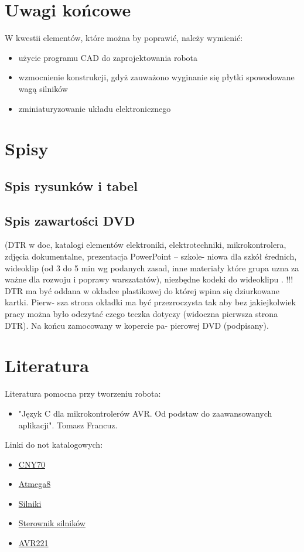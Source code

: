 \documentclass[11pt,a4paper]{article}
\begin{document}
\section{Uwagi końcowe}
W kwestii elementów, które można by poprawić, należy wymienić:
\begin{itemize}
  \item użycie programu CAD do zaprojektowania robota
  \item wzmocnienie konstrukcji, gdyż zauważono wyginanie się płytki spowodowane wagą silników
  \item zminiaturyzowanie układu elektronicznego
\end{itemize}

\section{Spisy}
\subsection{Spis rysunków i tabel} 
\listoffigures

\subsection{Spis zawartości DVD} 
(DTR w doc, katalogi elementów elektroniki,
elektrotechniki, mikrokontrolera, zdjęcia dokumentalne, prezentacja PowerPoint – szkole-
niowa dla szkół średnich, wideoklip (od 3 do 5 min wg podanych zasad, inne materiały które
grupa uzna za ważne dla rozwoju i poprawy warszatatów), niezbędne kodeki do wideoklipu .
!!! DTR ma być oddana w okładce plastikowej do której wpina się dziurkowane kartki. Pierw-
sza strona okładki ma być przezroczysta tak aby bez jakiejkolwiek pracy można było odczytać
czego teczka dotyczy (widoczna pierwsza strona DTR). Na końcu zamocowany w kopercie pa-
pierowej DVD (podpisany). 

\section{Literatura}
Literatura pomocna przy tworzeniu robota:
\begin{itemize}
  \item "Język C dla mikrokontrolerów AVR. Od podstaw do zaawansowanych aplikacji". Tomasz Francuz.
\end{itemize}

Linki do not katalogowych:
\begin{itemize}
  \item \href{http://www.vishay.com/docs/83751/cny70.pdf}{CNY70}
  \item \href{http://www.atmel.com/images/atmel-2486-8-bit-avr-microcontroller-atmega8_l_datasheet.pdf}{Atmega8}
  \item \href{http://www.micromotorssrl.com/motor_hl149/HL149.pdf}{Silniki}
  \item \href{http://www.ti.com/lit/ds/symlink/l293d.pdf}{Sterownik silników}
  \item \href{http://www.atmel.com/images/doc2558.pdf}{AVR221}
\end{itemize}
\end{document}
